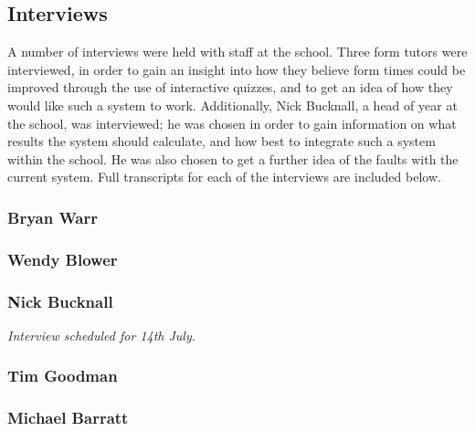 \subsection{Interviews}

A number of interviews were held with staff at the school. Three form tutors were interviewed, in order to gain an insight into how they believe form times could be improved through the use of interactive quizzes, and to get an idea of how they would like such a system to work. Additionally, Nick Bucknall, a head of year at the school, was interviewed; he was chosen in order to gain information on what results the system should calculate, and how best to integrate such a system within the school. He was also chosen to get a further idea of the faults with the current system. Full transcripts for each of the interviews are included below.

\subsubsection{Bryan Warr}


\subsubsection{Wendy Blower}



\subsubsection{Nick Bucknall}

\textit{Interview scheduled for 14th July.}

\subsubsection{Tim Goodman}

\subsubsection{Michael Barratt}